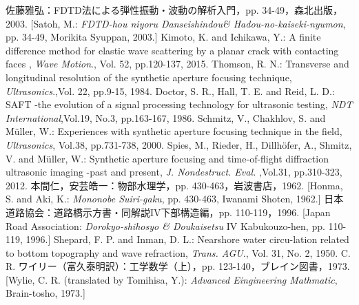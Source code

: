 \documentclass{jjsce}
\begin{document}
\begin{thebibliography}{9}
	佐藤雅弘：FDTD法による弾性振動・波動の解析入門，pp. 34-49，森北出版，2003. 
	[Satoh, M.: \textit{FDTD-hou niyoru Danseishindou\& Hadou-no-kaiseki-nyumon}, pp. 34-49, Morikita Syuppan, 2003.]
	Kimoto, K. and Ichikawa, Y.:
	A finite difference method for elastic wave scattering by a planar crack with contacting faces
	, \textit{Wave Motion}., Vol. 52, pp.120-137, 2015.
	Thomson, R. N.:
	Transverse and longitudinal resolution of the synthetic aperture focusing technique,
	\textit{Ultrasonics}.,Vol. 22, pp.9-15, 1984. 
	Doctor, S. R., Hall, T. E. and Reid, L. D.:
	SAFT -the evolution of a signal processing technology for ultrasonic testing,
	\textit{ NDT International},Vol.19, No.3, pp.163-167, 1986. 
	Schmitz, V.,  Chakhlov, S. and M\"{u}ller, W.:
	Experiences with synthetic aperture focusing technique in the field,
	\textit{ Ultrasonics}, Vol.38, pp.731-738, 2000.
	Spies, M., Rieder, H., Dillh\"{o}fer, A.,  Shmitz, V. and M\"{u}ller, W.:
	Synthetic aperture focusing and time-of-flight diffraction 
	ultrasonic imaging -past and present,
	\textit{ J. Nondestruct. Eval. },Vol.31, pp.310-323, 2012.
本間仁，安芸皓一：物部水理学，pp. 430-463，岩波書店，1962. [Honma, S. and Aki, K.: \textit{Mononobe Suiri-gaku}, pp. 430-463, Iwanami Shoten, 1962.]
日本道路協会：道路橋示方書・同解説IV下部構造編，pp. 110-119，1996. [Japan Road Association: \textit{Dorokyo-shihosyo \& Doukaisetsu} IV Kabukouzo-hen, pp. 110-119, 1996.]
Shepard, F. P. and Inman, D. L.: Nearshore water circu-lation related to bottom topography and wave refraction, \textit{Trans. AGU}., Vol. 31, No. 2, 1950.
C. R. ワイリー（富久泰明訳）：工学数学（上），pp. 123-140，ブレイン図書，1973. [Wylie, C. R. (translated by Tomihisa, Y.): \textit{Advanced Eingineering Mathmatic}, Brain-tosho, 1973.]
\end{thebibliography}
\end{document}
